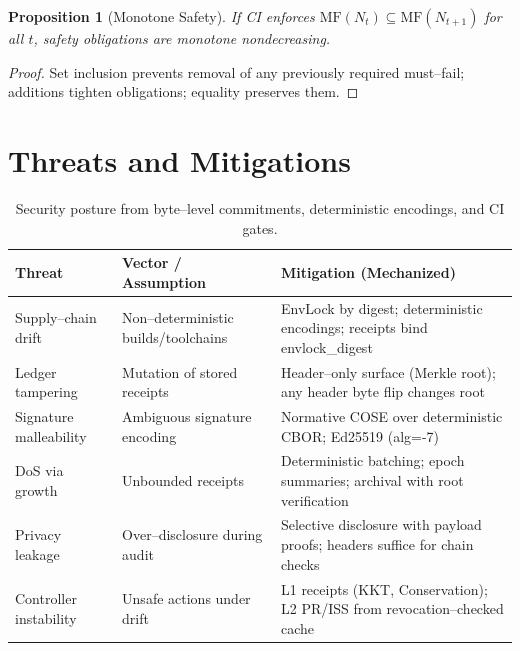 \documentclass[11pt]{article}
\theoremstyle{plain}
\newtheorem{proposition}[theorem]{Proposition}
\theoremstyle{definition}
\theoremstyle{remark}
\def\texttt#1{#1}%
\newcommand{\code}[1]{\texttt{#1}}
\begin{document}
\begin{proposition}[Monotone Safety]
If CI enforces $\mathrm{MF}(N_t)\subseteq \mathrm{MF}(N_{t+1})$ for all $t$, safety obligations are monotone nondecreasing.
\end{proposition}
\begin{proof}
Set inclusion prevents removal of any previously required must--fail; additions tighten obligations; equality preserves them.
\end{proof}

\section{Threats and Mitigations}
\begin{table}[t]
\centering
\begin{tabular}{@{}p{3.2cm}p{6.0cm}p{5.8cm}@{}}
\toprule
\textbf{Threat} & \textbf{Vector / Assumption} & \textbf{Mitigation (Mechanized)}\\
\midrule
Supply--chain drift & Non--deterministic builds/toolchains & EnvLock by digest; deterministic encodings; receipts bind \code{envlock\_digest} \\
Ledger tampering & Mutation of stored receipts & Header--only surface (Merkle root); any header byte flip changes root \\
Signature malleability & Ambiguous signature encoding & Normative COSE over deterministic CBOR; Ed25519 (\code{alg=-7}) \\
DoS via growth & Unbounded receipts & Deterministic batching; epoch summaries; archival with root verification \\
Privacy leakage & Over--disclosure during audit & Selective disclosure with payload proofs; headers suffice for chain checks \\
Controller instability & Unsafe actions under drift & L1 receipts (KKT, Conservation); L2 PR/ISS from revocation--checked cache \\
\bottomrule
\end{tabular}
\caption{Security posture from byte--level commitments, deterministic encodings, and CI gates.}
\end{table}
\end{document}
